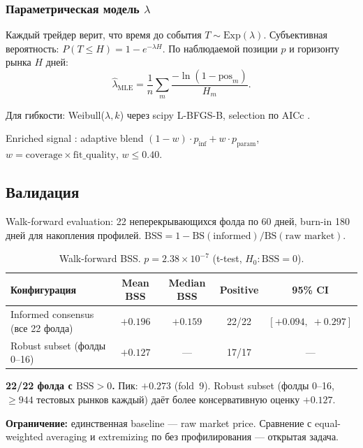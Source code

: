 \documentclass[a4paper, 11pt]{article}
\newcommand{\bs}{\mathrm{BS}}
\newcommand{\bss}{\mathrm{BSS}}
\begin{document}
\subsubsection{Параметрическая модель $\lambda$}

Каждый трейдер верит, что время до события $T \sim \mathrm{Exp}(\lambda)$.
Субъективная вероятность: $P(T \leq H) = 1 - e^{-\lambda H}$.
По наблюдаемой позиции $p$ и горизонту рынка $H$ дней:
\begin{equation}
\label{eq:lambda}
\hat{\lambda}_{\mathrm{MLE}} = \frac{1}{n} \sum_{m} \frac{-\ln(1 - \mathrm{pos}_m)}{H_m}.
\end{equation}

Для гибкости: Weibull($\lambda, k$) через scipy L-BFGS-B,
selection по AICc \citep{burnham2002model}.

Enriched signal \citep{clinton2024polymarket}: adaptive blend
$(1-w)\cdot p_{\mathrm{inf}} + w \cdot p_{\mathrm{param}}$,
$w = \mathrm{coverage} \times \mathrm{fit\_quality}$, $w \leq 0.40$.

\subsection{Валидация}

Walk-forward evaluation: 22 неперекрывающихся фолда по 60 дней,
burn-in 180 дней для накопления профилей.
$\bss = 1 - \bs(\text{informed}) / \bs(\text{raw market})$.

\begin{table}[h]
\centering
\begin{tabular}{lcccc}
\toprule
\textbf{Конфигурация} & \textbf{Mean BSS} & \textbf{Median BSS} & \textbf{Positive} & \textbf{95\% CI} \\
\midrule
Informed consensus (все 22 фолда)  & $+0.196$ & $+0.159$ & 22/22 & $[+0.094,\; +0.297]$ \\
Robust subset (фолды 0--16)        & $+0.127$ & ---      & 17/17 & --- \\
\bottomrule
\end{tabular}
\caption{Walk-forward BSS. $p = 2.38 \times 10^{-7}$ (t-test, $H_0: \bss = 0$).}
\label{tab:walkforward}
\end{table}

\textbf{22/22 фолда с $\bss > 0$.} Пик: $+0.273$ (fold~9).
Robust subset (фолды 0--16, $\geq 944$ тестовых рынков каждый) даёт
более консервативную оценку $+0.127$.

\textbf{Ограничение:} единственная baseline --- raw market price.
Сравнение с equal-weighted averaging и extremizing по
\citealt{satopaa2014combining} без профилирования --- открытая задача.
\end{document}
